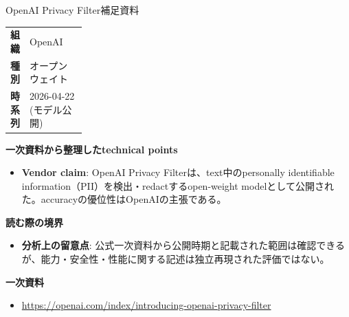 \begin{technicalnote}{OpenAI Privacy Filter}{補足資料}
\begingroup
\begin{tabularx}{\linewidth}{@{}>{\bfseries}p{0.22\linewidth}X@{}}
組織 & OpenAI \\
種別 & オープンウェイト \\
時系列 & 2026-04-22 (モデル公開) \\
\end{tabularx}
\smallskip
{\bfseries 一次資料から整理したtechnical points}
\begin{itemize}[leftmargin=1.5em,itemsep=0.35em]
\item \textbf{Vendor claim}: OpenAI Privacy Filterは、text中のpersonally identifiable information（PII）を検出・redactするopen-weight modelとして公開された。accuracyの優位性はOpenAIの主張である。
\end{itemize}
\begin{minipage}{\linewidth}
{\bfseries 読む際の境界}
\begin{itemize}[leftmargin=1.5em,itemsep=0.35em]
\item \textbf{分析上の留意点}: 公式一次資料から公開時期と記載された範囲は確認できるが、能力・安全性・性能に関する記述は独立再現された評価ではない。
\end{itemize}
\begin{samepage}
{\bfseries 一次資料}
\begingroup\sloppy
\begin{itemize}[leftmargin=1.5em,itemsep=0.25em]
\item {\scriptsize\url{https://openai.com/index/introducing-openai-privacy-filter}}
\end{itemize}
\endgroup
\end{samepage}
\end{minipage}
\endgroup
\end{technicalnote}
\medskip


